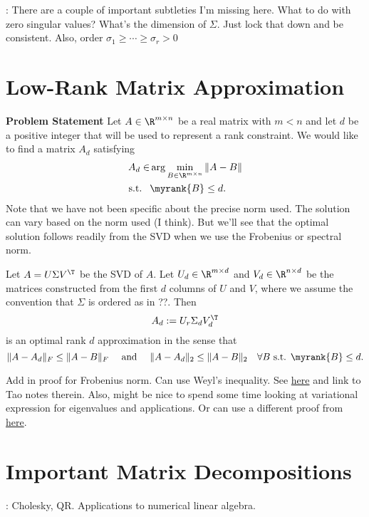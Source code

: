 : There are a couple of important subtleties I'm missing here. What to do with zero singular values? What's the dimension of $\Sigma$. Just lock that down and be consistent. Also, order $\sigma_1 \geq \cdots \geq \sigma_r > 0$

\section{Low-Rank Matrix Approximation}
\noindent \textbf{Problem Statement}
Let $A\in \R^{m\times n}$ be a real matrix with $m< n$ and let $d$ be a positive integer that will be used to represent a rank constraint. We would like to find a matrix $A_d$ satisfying 
\begin{align}
A_d \in & \arg\min_{B\in \R^{m\times n}} \|A - B\|\\
\mbox{s.t. } ~ & \myrank{B} \leq d.
\end{align}
Note that we have not been specific about the precise norm used. The solution can vary based on the norm used (I think). But we'll see that the optimal solution follows readily from the SVD when we use the Frobenius or spectral norm. 

\begin{theorem}
Let $A = U\Sigma V^\T$ be the SVD of $A$. Let $U_d\in \R^{m\times d}$ and $V_d\in \R^{n\times d}$ be the matrices constructed from the first $d$ columns of $U$ and $V$, where we assume the convention that $\Sigma$ is ordered as in ??. 
Then
$$
A_d := U_r \Sigma_d V_d^\T
$$
is an optimal rank $d$ approximation in the sense that
$$
\|A - A_d\|_F \leq \|A - B\|_F \quad \mbox{ and } \quad \|A - A_d\|_2 \leq \|A - B\|_2 \quad \forall B \mbox{ s.t. } \myrank{B} \leq d.
$$
\end{theorem}

 Add in proof for Frobenius norm. Can use Weyl's inequality. See \href{https://en.wikipedia.org/wiki/Weyl\%27s_inequality}{here} and link to Tao notes therein. Also, might be nice to spend some time looking at variational expression for eigenvalues and applications. Or can use a different proof from \href{https://people.math.osu.edu/costin.10/5101/Low\%20rank\%20Approx.pdf}{here}.

\section{Important Matrix Decompositions}
: Cholesky, QR. Applications to numerical linear algebra. 

